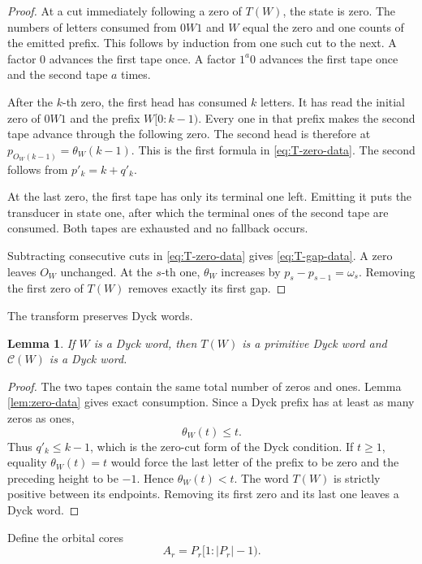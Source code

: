 \documentclass[11pt]{article}
\newtheorem{lemma}[theorem]{Lemma}
\theoremstyle{definition}
\theoremstyle{remark}
\begin{document}
\begin{proof}
At a cut immediately following a zero of \(T(W)\), the state is zero.  The
numbers of letters consumed from \(0W1\) and \(W\) equal the zero and one
counts of the emitted prefix.  This follows by induction from one such cut to
the next.  A factor \(0\) advances the first tape once.  A factor \(1^a0\)
advances the first tape once and the second tape \(a\) times.

After the \(k\)-th zero, the first head has consumed \(k\) letters.  It has
read the initial zero of \(0W1\) and the prefix \(W[0:k-1)\).  Every one in
that prefix makes the second tape advance through the following zero.  The
second head is therefore at
\(p_{O_W(k-1)}=\theta_W(k-1)\).  This is the first formula in
\eqref{eq:T-zero-data}.  The second follows from \(p'_k=k+q'_k\).

At the last zero, the first tape has only its terminal one left.  Emitting it
puts the transducer in state one, after which the terminal ones of the second
tape are consumed.  Both tapes are exhausted and no fallback occurs.

Subtracting consecutive cuts in \eqref{eq:T-zero-data} gives
\eqref{eq:T-gap-data}.  A zero leaves \(O_W\) unchanged.  At the \(s\)-th one,
\(\theta_W\) increases by \(p_s-p_{s-1}=\omega_s\).  Removing the first zero of
\(T(W)\) removes exactly its first gap.
\end{proof}

The transform preserves Dyck words.
\begin{lemma}
\label{lem:T-dyck}
If \(W\) is a Dyck word, then \(T(W)\) is a primitive Dyck word and
\(\mathcal C(W)\) is a Dyck word.
\end{lemma}

\begin{proof}
The two tapes contain the same total number of zeros and ones.  Lemma
\ref{lem:zero-data} gives exact consumption.  Since a Dyck prefix has at
least as many zeros as ones,
\[
 \theta_W(t)\leq t.
\]
Thus \(q'_k\leq k-1\), which is the zero-cut form of the Dyck condition.  If
\(t\geq1\), equality \(\theta_W(t)=t\) would force the last letter of the
prefix to be zero and the preceding height to be \(-1\).  Hence
\(\theta_W(t)<t\).  The word \(T(W)\) is strictly positive between its
endpoints.  Removing its first zero and its last one leaves a Dyck word.
\end{proof}

Define the orbital cores
\begin{equation*}
 A_r=P_r[1:|P_r|-1).
\end{equation*}
\end{document}
